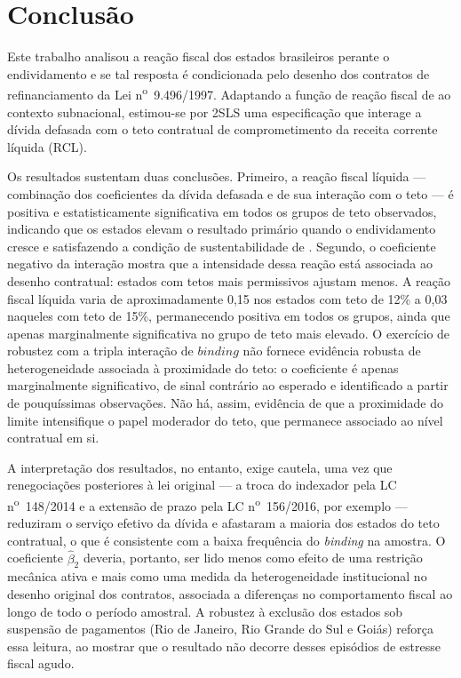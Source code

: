 \chapter{Conclusão}
\label{chap:conclusao}

Este trabalho analisou a reação fiscal dos estados brasileiros perante o endividamento e se tal resposta é condicionada pelo desenho dos contratos de refinanciamento da Lei n\textsuperscript{o}~9.496/1997. Adaptando a função de reação fiscal de  ao contexto subnacional, estimou-se por 2SLS uma especificação que interage a dívida defasada com o teto contratual de comprometimento da receita corrente líquida (RCL).

Os resultados sustentam duas conclusões. Primeiro, a reação fiscal líquida --- combinação dos coeficientes da dívida defasada e de sua interação com o teto --- é positiva e estatisticamente significativa em todos os grupos de teto observados, indicando que os estados elevam o resultado primário quando o endividamento cresce e satisfazendo a condição de sustentabilidade de . Segundo, o coeficiente negativo da interação mostra que a intensidade dessa reação está associada ao desenho contratual: estados com tetos mais permissivos ajustam menos. A reação fiscal líquida varia de aproximadamente 0,15 nos estados com teto de 12\% a 0,03 naqueles com teto de 15\%, permanecendo positiva em todos os grupos, ainda que apenas marginalmente significativa no grupo de teto mais elevado. O exercício de robustez com a tripla interação de $binding$ não fornece evidência robusta de heterogeneidade associada à proximidade do teto: o coeficiente é apenas marginalmente significativo, de sinal contrário ao esperado e identificado a partir de pouquíssimas observações. Não há, assim, evidência de que a proximidade do limite intensifique o papel moderador do teto, que permanece associado ao nível contratual em si.

A interpretação dos resultados, no entanto, exige cautela, uma vez que renegociações posteriores à lei original --- a troca do indexador pela LC n\textsuperscript{o}~148/2014 e a extensão de prazo pela LC n\textsuperscript{o}~156/2016, por exemplo --- reduziram o serviço efetivo da dívida e afastaram a maioria dos estados do teto contratual, o que é consistente com a baixa frequência do \textit{binding} na amostra. O coeficiente $\hat{\beta}_2$ deveria, portanto, ser lido menos como efeito de uma restrição mecânica ativa e mais como uma medida da heterogeneidade institucional no desenho original dos contratos, associada a diferenças no comportamento fiscal ao longo de todo o período amostral. A robustez à exclusão dos estados sob suspensão de pagamentos (Rio de Janeiro, Rio Grande do Sul e Goiás) reforça essa leitura, ao mostrar que o resultado não decorre desses episódios de estresse fiscal agudo.

